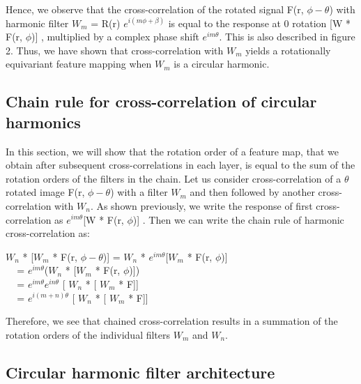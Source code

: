 \documentclass{article}
\begin{document}
Hence, we observe that the cross-correlation of the rotated signal F(r, $\phi - \theta$) with harmonic filter $W_m$ = R(r) $e^{i(m \phi + \beta)}$ is equal to the response at 0 rotation [W * F(r, $\phi$)] , multiplied by a complex phase shift $e^{i m \theta}$. This is also described in figure 2. Thus, we have shown that cross-correlation with $W_m$ yields a rotationally equivariant feature mapping when $W_m$ is a circular harmonic. 
\subsection{Chain rule for cross-correlation of circular harmonics}
In this section, we will show that the rotation order of a feature map, that we obtain after subsequent cross-correlations in each layer, is equal to the sum of the rotation orders of the filters in the chain.
Let us consider cross-correlation of a $\theta$ rotated image F(r, $\phi - \theta$)  with a filter $W_m$ and then followed by another cross-correlation with $W_n$. As shown previously, we write the response of first cross-correlation as  $e^{i m \theta}$[W * F(r, $\phi$)] . Then we can write the chain rule of harmonic cross-correlation as:
\vspace{-0.1cm}
\begin{center} 
$W_n$ * [$W_m$ * F(r, $\phi - \theta$)] = $W_n$ * $e^{i m \theta}$[$W_m$ * F(r, $\phi$)] \\ \vspace{0.1cm}
$\hspace{10pt}$ = $e^{i m \theta}$($W_n$ * [$W_m$ * F(r, $\phi$)])   \\ \vspace{0.1cm}
$\hspace{10pt}$ = $e^{i m \theta} e^{i n \theta}$ [ $W_n$ * [ $W_m$ * F]]  \\ \vspace{0.1cm}
$\hspace{10pt}$ = $e^{i (m + n) \theta} $ [ $W_n$ * [ $W_m$ * F]] 
\end{center}

Therefore, we see that chained cross-correlation results in a summation of the rotation orders of the individual filters $W_m$ and $W_n$.



\subsection{Circular harmonic filter architecture}
\end{document}
